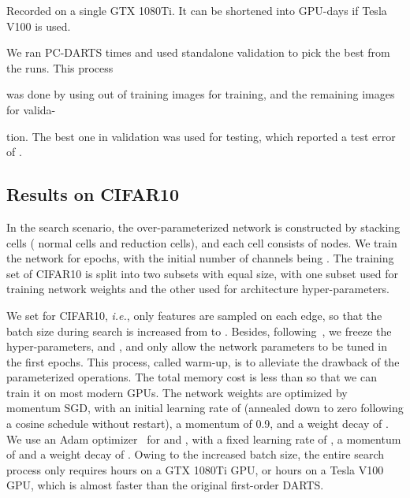 \documentclass{article} \usepackage{iclr2020_conference,times}
\begin{document}
\begin{table}[t]
\begin{threeparttable}[b]
{\begin{tabular}{@{}lcccccc@{}}
\bottomrule
\end{tabular}
}
\begin{tablenotes}
\item[] {\footnotesize Recorded on a single GTX 1080Ti. It can be shortened into  GPU-days if Tesla V100 is used.}
\item[] {\footnotesize We ran PC-DARTS  times and used standalone validation to pick the best from the  runs. This process}
\item {\footnotesize was done by using  out of  training images for training, and the remaining  images for valida-}
\item {\footnotesize tion. The best one in validation was used for testing, which reported a test error of .}
\end{tablenotes}
\end{threeparttable}
\end{table}

\subsection{Results on CIFAR10}
\label{Experiments:CIFAR10}

In the search scenario, the over-parameterized network is constructed by stacking  cells ( normal cells and  reduction cells), and each cell consists of  nodes. We train the network for  epochs, with the initial number of channels being . The  training set of CIFAR10 is split into two subsets with equal size, with one subset used for training network weights and the other used for architecture hyper-parameters.

We set  for CIFAR10, \textit{i.e.}, only  features are sampled on each edge, so that the batch size during search is increased from  to . Besides, following~\citep{chen2019progressive}, we freeze the hyper-parameters,  and , and only allow the network parameters to be tuned in the first  epochs. This process, called warm-up, is to alleviate the drawback of the parameterized operations. The total memory cost is less than  so that we can train it on most modern GPUs. The network weights are optimized by momentum SGD, with an initial learning rate of  (annealed down to zero following a cosine schedule without restart), a momentum of 0.9, and a weight decay of . We use an Adam optimizer~\citep{kingma2014adam} for  and , with a fixed learning rate of , a momentum of  and a weight decay of . Owing to the increased batch size, the entire search process only requires  hours on a GTX 1080Ti GPU, or  hours on a Tesla V100 GPU, which is almost  faster than the original first-order DARTS.
\end{document}
